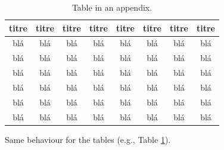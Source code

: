 \documentclass[letterpaper%
, twoside%
, 12pt%
,these%
, english%
,creativecommons,hyperref%
]{thETS}
\begin{document}
\begin{table}
		\parbox{0.65\textwidth}{\caption{Table in an appendix.}\label{tab:testAp}}

		\begin{tabular}{|c|c|c|c|c|c|c|c|}
		\hline
			{\bf titre} & {\bf titre} & {\bf titre} & {\bf titre} & {\bf titre} & {\bf titre} & {\bf titre} & {\bf titre} \\
	  \hline
			blá & blá & blá & blá & blá & blá & blá & blá \\
	  \hline
			blá & blá & blá & blá & blá & blá & blá & blá \\
	  \hline
			blá & blá & blá & blá & blá & blá & blá & blá \\
	  \hline
			blá & blá & blá & blá & blá & blá & blá & blá \\
	  \hline
			blá & blá & blá & blá & blá & blá & blá & blá \\
	  \hline
			blá & blá & blá & blá & blá & blá & blá & blá \\
	  \hline
		\end{tabular}
\end{table}

Same behaviour for the tables (e.g., Table \ref{tab:testAp}).



\newpage
\begin{spacing}{1}
	\nocite{*} %


\end{spacing}


\newpage
\begin{spacing}{1}


\end{spacing}
\end{document}
